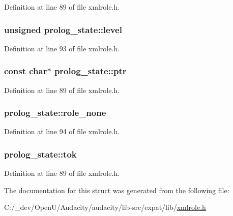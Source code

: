 Definition at line 89 of file xmlrole.\+h.

\subsubsection[{\texorpdfstring{level}{level}}]{\setlength{\rightskip}{0pt plus 5cm}unsigned prolog\+\_\+state\+::level}\hypertarget{structprolog__state_a9bc6e108c8efd3bc37d42feb18eb8c6b}{}\label{structprolog__state_a9bc6e108c8efd3bc37d42feb18eb8c6b}


Definition at line 93 of file xmlrole.\+h.

\subsubsection[{\texorpdfstring{ptr}{ptr}}]{ {\bf const} char$\ast$ prolog\+\_\+state\+::ptr}\hypertarget{structprolog__state_acc32115fc74ba5f3fd3e721670466a15}{}\label{structprolog__state_acc32115fc74ba5f3fd3e721670466a15}


Definition at line 89 of file xmlrole.\+h.

\subsubsection[{\texorpdfstring{role\+\_\+none}{role_none}}]{ prolog\+\_\+state\+::role\+\_\+none}\hypertarget{structprolog__state_aeba13f636dda0ee3f274a81fd865e223}{}\label{structprolog__state_aeba13f636dda0ee3f274a81fd865e223}


Definition at line 94 of file xmlrole.\+h.

\subsubsection[{\texorpdfstring{tok}{tok}}]{ prolog\+\_\+state\+::tok}\hypertarget{structprolog__state_ac4af903bc6d08bf5945abf850aee2a67}{}\label{structprolog__state_ac4af903bc6d08bf5945abf850aee2a67}


Definition at line 89 of file xmlrole.\+h.



The documentation for this struct was generated from the following file\+:\begin{DoxyCompactItemize}
\item 
C\+:/\+\_\+dev/\+Open\+U/\+Audacity/audacity/lib-\/src/expat/lib/\hyperlink{xmlrole_8h}{xmlrole.\+h}\end{DoxyCompactItemize}
